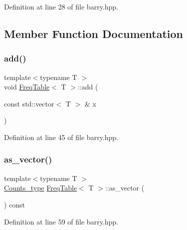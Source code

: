 Definition at line 28 of file barry.\+hpp.



\subsection{Member Function Documentation}
\mbox{\label{classbarry_1_1_freq_table_a919e08556ba3aa9535a64827315bb89a}} 
\subsubsection{\texorpdfstring{add()}{add()}}
{\footnotesize\ttfamily template$<$typename T $>$ \\
void \hyperlink{classbarry_1_1_freq_table}{Freq\+Table}$<$ T $>$\+::add (\begin{DoxyParamCaption}\item[{const std\+::vector$<$ T $>$ \&}]{x }\end{DoxyParamCaption})\hspace{0.3cm}{\ttfamily [inline]}}



Definition at line 45 of file barry.\+hpp.

\mbox{\label{classbarry_1_1_freq_table_a1898e62605d8753e170189936d403e05}} 
\subsubsection{\texorpdfstring{as\+\_\+vector()}{as\_vector()}}
{\footnotesize\ttfamily template$<$typename T $>$ \\
\hyperlink{namespacebarry_a3e2d8c3b6cf602107559d4237d9f1315}{Counts\+\_\+type} \hyperlink{classbarry_1_1_freq_table}{Freq\+Table}$<$ T $>$\+::as\+\_\+vector (\begin{DoxyParamCaption}{ }\end{DoxyParamCaption}) const\hspace{0.3cm}{\ttfamily [inline]}}



Definition at line 59 of file barry.\+hpp.

